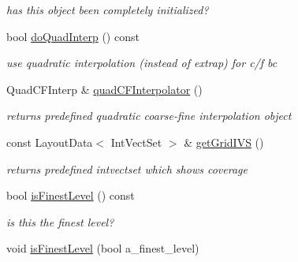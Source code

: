 \begin{DoxyCompactItemize}
\begin{DoxyCompactList}\small\item\em has this object been completely initialized? \end{DoxyCompactList}\item 
\hypertarget{class_c_c_projector_afc4a0d19f0795d6f0e8c32902a03a01f}{bool \hyperlink{class_c_c_projector_afc4a0d19f0795d6f0e8c32902a03a01f}{do\-Quad\-Interp} () const }\label{class_c_c_projector_afc4a0d19f0795d6f0e8c32902a03a01f}

\begin{DoxyCompactList}\small\item\em use quadratic interpolation (instead of extrap) for c/f bc \end{DoxyCompactList}\item 
\hypertarget{class_c_c_projector_a52bc277796c2e16fcf7c4da6a9756097}{Quad\-C\-F\-Interp \& \hyperlink{class_c_c_projector_a52bc277796c2e16fcf7c4da6a9756097}{quad\-C\-F\-Interpolator} ()}\label{class_c_c_projector_a52bc277796c2e16fcf7c4da6a9756097}

\begin{DoxyCompactList}\small\item\em returns predefined quadratic coarse-\/fine interpolation object \end{DoxyCompactList}\item 
\hypertarget{class_c_c_projector_aee236ee73b669fd0bc6a3e08a3540df1}{const Layout\-Data$<$ Int\-Vect\-Set $>$ \& \hyperlink{class_c_c_projector_aee236ee73b669fd0bc6a3e08a3540df1}{get\-Grid\-I\-V\-S} ()}\label{class_c_c_projector_aee236ee73b669fd0bc6a3e08a3540df1}

\begin{DoxyCompactList}\small\item\em returns predefined intvectset which shows coverage \end{DoxyCompactList}\item 
\hypertarget{class_c_c_projector_aa6c16b1dfb4ea8b60c34bdecc9abd919}{bool \hyperlink{class_c_c_projector_aa6c16b1dfb4ea8b60c34bdecc9abd919}{is\-Finest\-Level} () const }\label{class_c_c_projector_aa6c16b1dfb4ea8b60c34bdecc9abd919}

\begin{DoxyCompactList}\small\item\em is this the finest level? \end{DoxyCompactList}\item 
\hypertarget{class_c_c_projector_a6a90b1421b4b069fb2cd8030b6f69010}{void \hyperlink{class_c_c_projector_a6a90b1421b4b069fb2cd8030b6f69010}{is\-Finest\-Level} (bool a\-\_\-finest\-\_\-level)}\label{class_c_c_projector_a6a90b1421b4b069fb2cd8030b6f69010}


\end{DoxyCompactItemize}
